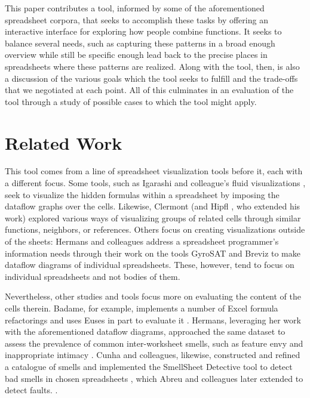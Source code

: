 \documentclass[conference]{IEEEtran}
\begin{document}
	This paper contributes a tool, informed by some of the aforementioned
	spreadsheet corpora, that seeks to accomplish these tasks by offering an
	interactive interface for exploring how people combine functions. It seeks to
	balance several needs, such as capturing these patterns in a broad enough
	overview while still be specific enough lead back to the precise places in
	spreadsheets where these patterns are realized. Along with the tool, then, is
	also a discussion of the various goals which the tool seeks to fulfill and the
	trade-offs that we negotiated at each point. All of this culminates in an
	evaluation of the tool through a study of possible cases to which the tool
	might apply.
	
	\section{Related Work} This tool comes from a line of spreadsheet visualization
	tools before it, each with a different focus. Some tools, such as Igarashi and
	colleague's fluid visualizations \cite{igarashi1998fluid}, seek to visualize
	the hidden formulas within a spreadsheet by imposing the dataflow graphs over
	the cells. Likewise, Clermont \cite{clermont2003scalable} (and Hipfl
	\cite{hipfl2008using}, who extended his work) explored various ways of
	visualizing groups of related cells through similar functions, neighbors, or
	references. Others focus on creating visualizations outside of the sheets:
	Hermans and colleagues address a spreadsheet programmer's information needs
	through their work on the tools GyroSAT \cite{hermans2011supporting} and Breviz
	\cite{hermans2011breviz} to make dataflow diagrams of individual spreadsheets.
	These, however, tend to focus on individual spreadsheets and not bodies of
	them. \par
	
	Nevertheless, other studies and tools focus more on evaluating the content of
	the cells therein. Badame, for example, implements a number of Excel formula
	refactorings and uses Euses in part to evaluate it
	\cite{badame2012refactoring}. Hermans, leveraging her work with the
	aforementioned dataflow diagrams, approached the same dataset to assess the
	prevalence of common inter-worksheet smells, such as feature envy and
	inappropriate intimacy \cite{hermans2012detecting}. Cunha and colleagues,
	likewise, constructed and refined a catalogue of smells and implemented the
	SmellSheet Detective tool to detect bad smells in chosen spreadsheets
	\cite{cunha2012towards}, which Abreu and colleagues later extended to detect
	faults. \cite{abreu2014smelling}.\par
	
\end{document}
